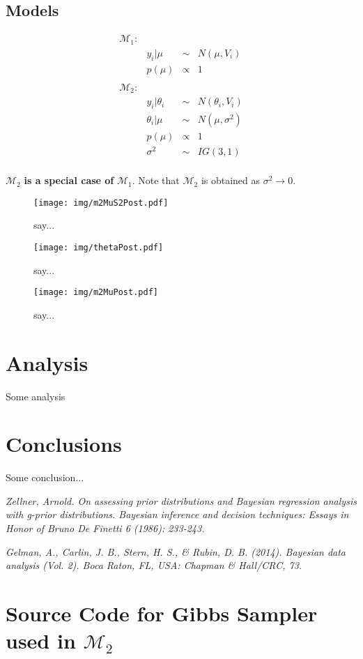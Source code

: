 \documentclass{../../tex_template/asaproc}
\newcommand{\M}{\mathcal{M}}
\begin{document}
\subsection{Models}

$$
\begin{array}{lrcl}
  \M_1: \\
  & y_i | \mu &\sim& N(\mu,V_i)\\
  & p(\mu) &\propto& 1\\
  \\
  \M_2: \\
  & y_i | \theta_i &\sim& N(\theta_i,V_i)\\
  & \theta_i | \mu &\sim& N(\mu,\sigma^2)\\
  & p(\mu) &\propto& 1\\
  & \sigma^2 &\sim& IG(3,1)\\
\end{array}
$$

$\M_2$ \textbf{is a special case of} $\M_1$. Note that $\M_2$ is
obtained as $\sigma^2 \rightarrow 0$.

\begin{figure}[H]
  \texttt{[image: img/m2MuS2Post.pdf]}
  \caption{say...}
  \label{fig:m2MuS2Post}
\end{figure}

\begin{figure}[H]
  \texttt{[image: img/thetaPost.pdf]}
  \caption{say...}
  \label{fig:thetaPost}
\end{figure}

\begin{figure}[H]
  \texttt{[image: img/m2MuPost.pdf]}
  \caption{say...}
  \label{fig:m2MuPost}
\end{figure}

\section{Analysis}
Some analysis

\section{Conclusions}
Some conclusion...

\begin{references}
{\footnotesize
\itemsep=3pt
\item {\em Zellner, Arnold. On assessing prior distributions and Bayesian regression analysis with g-prior distributions. Bayesian inference and decision techniques: Essays in Honor of Bruno De Finetti 6 (1986): 233-243.}
\item {\em Gelman, A., Carlin, J. B., Stern, H. S., \& Rubin, D. B. (2014). Bayesian data analysis (Vol. 2). Boca Raton, FL, USA: Chapman \& Hall/CRC, 73.}
}
\end{references}

\newpage
\section{Source Code for Gibbs Sampler used in $\M_2$}

\end{document}
